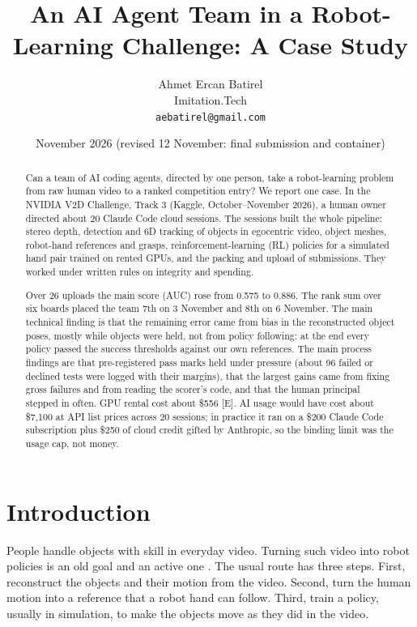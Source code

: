 \documentclass[11pt]{article}
\title{An AI Agent Team in a Robot-Learning Challenge: A Case Study}
\author{Ahmet Ercan Batirel\\Imitation.Tech\\\texttt{aebatirel@gmail.com}}
\date{November 2026 (revised 12 November: final submission and container)}
\begin{document}
\maketitle
\begin{abstract}
Can a team of AI coding agents, directed by one person, take a robot-learning problem from raw human video to a ranked competition entry? We report one case. In the NVIDIA V2D Challenge, Track 3 (Kaggle, October–November 2026), a human owner directed about 20 Claude Code cloud sessions. The sessions built the whole pipeline: stereo depth, detection and 6D tracking of objects in egocentric video, object meshes, robot-hand references and grasps, reinforcement-learning (RL) policies for a simulated hand pair trained on rented GPUs, and the packing and upload of submissions. They worked under written rules on integrity and spending.

Over 26 uploads the main score (AUC) rose from 0.575 to 0.886. The rank sum over six boards placed the team 7th on 3 November and 8th on 6 November. The main technical finding is that the remaining error came from bias in the reconstructed object poses, mostly while objects were held, not from policy following: at the end every policy passed the success thresholds against our own references. The main process findings are that pre-registered pass marks held under pressure (about 96 failed or declined tests were logged with their margins), that the largest gains came from fixing gross failures and from reading the scorer's code, and that the human principal stepped in often. GPU rental cost about \$556 {[}E{]}. AI usage would have cost about \$7,100 at API list prices across 20 sessions; in practice it ran on a \$200 Claude Code subscription plus \$250 of cloud credit gifted by Anthropic, so the binding limit was the usage cap, not money.

\end{abstract}
\section{Introduction}
People handle objects with skill in everyday video. Turning such video into robot policies is an old goal \cite{r1,r2} and an active one \cite{r3,r4,r5,r6}. The usual route has three steps. First, reconstruct the objects and their motion from the video. Second, turn the human motion into a reference that a robot hand can follow. Third, train a policy, usually in simulation, to make the objects move as they did in the video.
\end{document}
